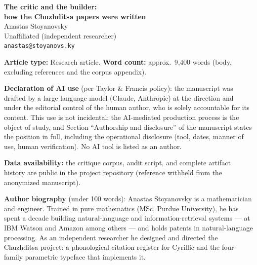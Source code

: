 \documentclass[12pt]{article}
\begin{document}
\begin{center}
{\LARGE\bfseries The critic and the builder:\\ how the Chuzhditsa papers were written}\\[2em]
{\large Anastas Stoyanovsky}\\[0.5em]
Unaffiliated (independent researcher)\\
\texttt{anastas@stoyanovs.ky}
\end{center}
\vspace{2em}
\noindent\textbf{Article type:} Research article. \quad \textbf{Word count:} approx.\ 9{,}400 words (body, excluding references and the corpus appendix).
\medskip

\noindent\textbf{Declaration of AI use} (per Taylor \& Francis policy): the manuscript was drafted by a large language model (Claude, Anthropic) at the direction and under the editorial control of the human author, who is solely accountable for its content. This use is not incidental: the AI-mediated production process is the object of study, and Section ``Authorship and disclosure'' of the manuscript states the position in full, including the operational disclosure (tool, dates, manner of use, human verification). No AI tool is listed as an author.
\medskip

\noindent\textbf{Data availability:} the critique corpus, audit script, and complete artifact history are public in the project repository (reference withheld from the anonymized manuscript).
\medskip

\noindent\textbf{Author biography} (under 100 words): Anastas Stoyanovsky is a mathematician and engineer. Trained in pure mathematics (MSc, Purdue University), he has spent a decade building natural-language and information-retrieval systems — at IBM Watson and Amazon among others — and holds patents in natural-language processing. As an independent researcher he designed and directed the Chuzhditsa project: a phonological citation register for Cyrillic and the four-family parametric typeface that implements it.
\end{document}
